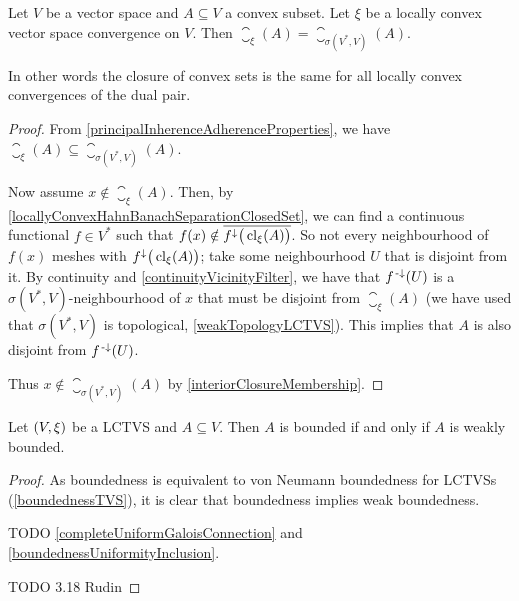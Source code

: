 \begin{proposition} \label{weakClosureConvexSubsets}
Let $V$ be a vector space and $A\subseteq V$ a convex subset. Let $\xi$ be a locally convex vector space convergence on $V$. Then $\closure_\xi(A) = \closure_{\sigma(V^*, V)}(A)$.
\end{proposition}
In other words the closure of convex sets is the same for all locally convex convergences of the dual pair.
\begin{proof}
From \ref{principalInherenceAdherenceProperties}, we have $\closure_\xi(A) \subseteq \closure_{\sigma(V^*, V)}(A)$.

Now assume $x\notin \closure_\xi(A)$. Then, by \ref{locallyConvexHahnBanachSeparationClosedSet}, we can find a continuous functional $f\in V^*$ such that $f(x) \notin \overline{f^{\downarrow}\big(\operatorname{cl}_\xi(A)\big)}$. So not every neighbourhood of $f(x)$ meshes with $f^{\downarrow}\big(\operatorname{cl}_\xi(A)\big)$; take some neighbourhood $U$ that is disjoint from it. By continuity and \ref{continuityVicinityFilter}, we have that $f^{{\text{\hspace{0.15em}-}\downarrow}}(U)$ is a $\sigma(V^*, V)$-neighbourhood of $x$ that must be disjoint from $\closure_\xi(A)$ (we have used that $\sigma(V^*, V)$ is topological, \ref{weakTopologyLCTVS}). This implies that $A$ is also disjoint from $f^{{\text{\hspace{0.15em}-}\downarrow}}(U)$.

Thus $x\notin \closure_{\sigma(V^*, V)}(A)$ by \ref{interiorClosureMembership}.
\end{proof}

\begin{proposition}
Let $\left( V,\xi \right)$ be a LCTVS and $A\subseteq V$. Then $A$ is bounded \textup{if and only if} $A$ is weakly bounded.
\end{proposition}
\begin{proof}
As boundedness is equivalent to von Neumann boundedness for LCTVSs (\ref{boundednessTVS}), it is clear that boundedness implies weak boundedness.

TODO \ref{completeUniformGaloisConnection} and \ref{boundednessUniformityInclusion}.

TODO 3.18 Rudin
\end{proof}


